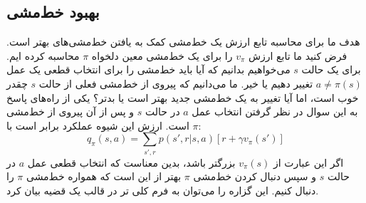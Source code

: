% 
%

\subsection{بهبود خط‌مشی}

هدف ما برای محاسبه تابع ارزش یک خط‌مشی کمک به یافتن خط‌مشی‌های بهتر است.
فرض کنید ما تابع ارزش 
$v_{\pi}$
 را برای یک خط‌مشی معین  دلخواه 
 $\pi$
  محاسبه کرده ایم. برای یک حالت 
  $s$
 می‌خواهیم بدانیم که آیا باید خط‌مشی را برای انتخاب قطعی یک عمل 
 $a \neq \pi(s)$
  تغییر دهیم یا خیر.
ما می‌دانیم که پیروی از خط‌مشی فعلی از حالت
 $s$
  چقدر خوب است، اما آیا تغییر به یک خط‌مشی جدید بهتر است یا بدتر؟
  یکی از راه‌های پاسخ به این سوال در نظر گرفتن انتخاب عمل  
  $a$
در حالت 
$s$
و پس از آن پیروی از خط‌مشی
$\pi$
 است. 
 ارزش این شیوه عملکرد برابر است با:
$$q_\pi(s,a) = \sum_{s',r} p(s',r|s,a)\left[r + \gamma v_\pi(s')\right]$$
 اگر این عبارت از $v_\pi(s)$ بزرگتر باشد، بدین معناست که انتخاب قطعی عمل $a$ در حالت $s$ و سپس دنبال کردن خط‌مشی $\pi$ بهتر از این است که همواره خط‌مشی $\pi$ را دنبال کنیم. این گزاره را می‌توان به فرم کلی تر در قالب یک قضیه بیان کرد.

